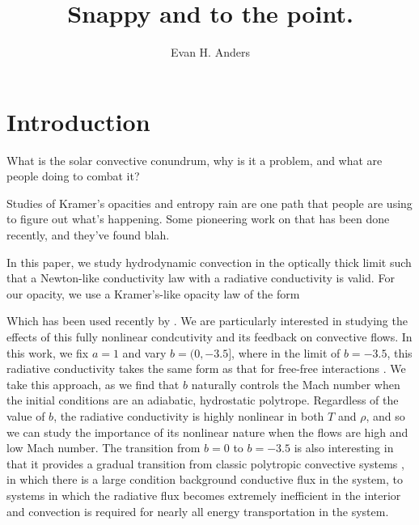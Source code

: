 \documentclass[twocolumn]{aastex62}
\begin{document}
\title{Snappy and to the point.}


\author{Evan H. Anders}


\begin{abstract}
\end{abstract}


\section{Introduction} \label{sec:intro}
What is the solar convective conundrum, why is it a problem, and what are people
doing to combat it?

Studies of Kramer's opacities and entropy rain are one path that people are using
to figure out what's happening. Some pioneering work on that has been done
recently, and they've found blah.

In this paper, we study hydrodynamic convection in the optically thick
limit such that a Newton-like conductivity law with a radiative conductivity
is valid. For our opacity, we use a Kramer's-like opacity law of the form


Which has been used recently by \cite{kapyla&all2017, kapyla&all2018}. We are particularly interested in studying
the effects of this fully nonlinear condcutivity and its feedback on convective
flows. In this work, we fix $a = 1$ and
vary $b = (0, -3.5]$, where in the limit of $b = -3.5$, this radiative conductivity
takes the same form as that for free-free interactions
\citep{Cox&Giuli}. We take this approach,
as we find that $b$ naturally controls the Mach number when the initial conditions
are an adiabatic, hydrostatic polytrope. Regardless of the value of $b$, the
radiative conductivity is highly nonlinear in both $T$ and $\rho$, and so we
can study the importance of its nonlinear nature when the flows are high and
low Mach number. The transition from $b = 0$ to $b = -3.5$ is also interesting
in that it provides a gradual transition from classic polytropic convective
systems \citep{hurlburt&all1984, brandenburg&all2005, anders&brown2017}, in
which there is a large condition background conductive flux in the system,
to systems in which the radiative flux becomes extremely inefficient in the
interior and convection is required for nearly all energy transportation
in the system.
\end{document}
